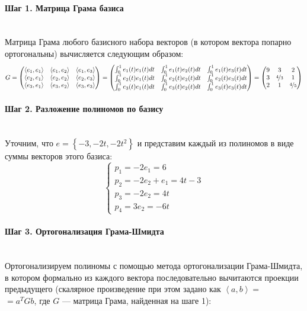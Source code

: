 \documentclass{article}
\begin{document}
\paragraph*{Шаг 1. Матрица Грама базиса} \, \\
Матрица Грама любого базисного набора векторов (в котором вектора попарно ортогональны) вычисляется следующим образом:
$$
    G = \begin{pmatrix}
        \left\langle e_1, e_1\right\rangle & \left\langle e_1, e_2\right\rangle & \left\langle e_1, e_3\right\rangle \\
        \left\langle e_2, e_1\right\rangle & \left\langle e_2, e_2\right\rangle & \left\langle e_2, e_3\right\rangle \\
        \left\langle e_3, e_1\right\rangle & \left\langle e_3, e_2\right\rangle & \left\langle e_3, e_3\right\rangle
    \end{pmatrix} = \begin{pmatrix}
        \int_0^1 e_1(t)e_1(t)dt & \int_0^1 e_1(t)e_2(t)dt & \int_0^1 e_1(t)e_3(t)dt \\
        \int_0^1 e_2(t)e_1(t)dt & \int_0^1 e_2(t)e_2(t)dt & \int_0^1 e_2(t)e_3(t)dt \\
        \int_0^1 e_3(t)e_1(t)dt & \int_0^1 e_3(t)e_2(t)dt & \int_0^1 e_3(t)e_3(t)dt
    \end{pmatrix} = \begin{pmatrix}
        9 & 3               & 2               \\
        3 & \nicefrac{4}{3} & 1               \\
        2 & 1               & \nicefrac{4}{5}
    \end{pmatrix}
$$

\paragraph*{Шаг 2. Разложение полиномов по базису} \, \\
Уточним, что $e = \left\{-3, -2t, -2t^2\right\} $ и представим каждый из полиномов в виде суммы векторов этого базиса:
$$\begin{cases}
        p_1 = -2e_1 = 6           \\
        p_2 = -2e_2 + e_1 = 4t -3 \\
        p_3 = -2e_2 = 4t          \\
        p_4 = 3e_2 = -6t
    \end{cases}$$

\paragraph*{Шаг 3. Ортогонализация Грама-Шмидта} \, \\
Ортогонализируем полиномы с помощью метода ортогонализации Грама-Шмидта, в котором формально из каждого вектора последовательно вычитаются проекции предыдущего (скалярное произведение при этом задано как $\left\langle a, b\right\rangle =$\\$= a^TGb$, где $G$ --- матрица Грама, найденная на шаге 1):
\end{document}

